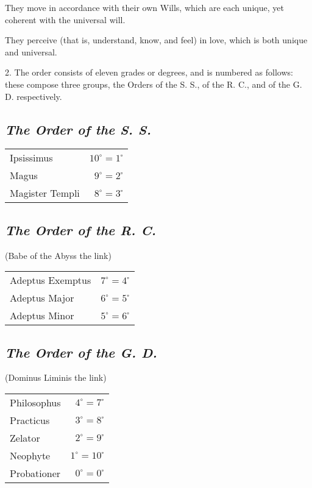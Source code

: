 They move in accordance with their own Wills, which are each unique, yet coherent with the universal will.

They perceive (that is, understand, know, and feel) in love, which is both unique and universal.

2. The order consists of eleven grades or degrees, and is numbered as follows: these compose three groups, the Orders of the S. S., of the R. C., and of the G. D. respectively.

\subsection*{\textit{The Order of the S. S.}}
\begin{center}
  \begin{tabular}{p{} r}
    Ipsissimus \dotfill & $10^{\circ}=1^{\square}$ \\
    Magus \dotfill & $9^{\circ}=2^{\square}$ \\
    Magister Templi \dotfill & $8^{\circ}=3^{\square}$ \\
    \end{tabular}
\end{center}

\subsection*{\textit{The Order of the R. C.}}
\begin{center}
  (Babe of the Abyss \textemdash{} the link)

  \begin{tabular}{p{} r}
    Adeptus Exemptus \dotfill & $7^{\circ}=4^{\square}$ \\
    Adeptus Major \dotfill & $6^{\circ}=5^{\square}$ \\
    Adeptus Minor \dotfill & $5^{\circ}=6^{\square}$ \\
  \end{tabular}
\end{center}

\subsection*{\textit{The Order of the G. D.}}
\begin{center}
  (Dominus Liminis \textemdash{} the link)

  \begin{tabular}{p{} r}
    Philosophus \dotfill & $4^{\circ}=7^{\square}$ \\
    Practicus \dotfill & $3^{\circ}=8^{\square}$ \\
    Zelator \dotfill & $2^{\circ}=9^{\square}$ \\
    Neophyte \dotfill & $1^{\circ}=10^{\square}$ \\
    Probationer \dotfill & $0^{\circ}=0^{\square}$ \\
  \end{tabular}
\end{center}

